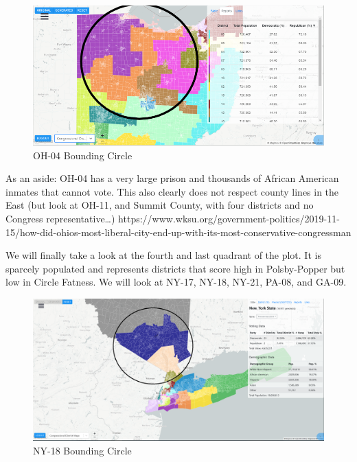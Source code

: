 \documentclass[letterpaper]{article}
\begin{document}
\begin{figure}[H]
	\includegraphics[width=\linewidth]{./figures/OH-04-BoundingCircle.png}
	\caption{OH-04 Bounding Circle}
	\label{fig:oh04boundingCircle}
\end{figure}


As an aside: OH-04 has a very large prison and thousands of African American inmates that cannot vote. This also clearly does not respect county lines in the East (but look at OH-11, and Summit County, with four districts and no Congress representative…)
https://www.wksu.org/government-politics/2019-11-15/how-did-ohios-most-liberal-city-end-up-with-its-most-conservative-congressman

We will finally take a look at the fourth and last quadrant of the plot. It is sparcely populated and represents districts that score high in Polsby-Popper but low in Circle Fatness. We will look at NY-17, NY-18, NY-21, PA-08, and GA-09.

\begin{figure}[H]
	\includegraphics[width=\linewidth]{./figures/NY-18-BoundingCircle.png}
	\caption{NY-18 Bounding Circle}
	\label{fig:ny18boundingCircle}
\end{figure}
\end{document}
